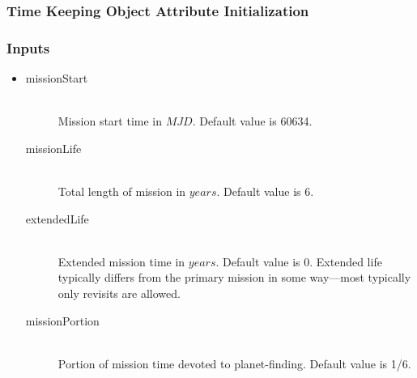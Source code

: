 \documentclass[cleanfoot]{asme2ej}
\begin{document}
\subsubsection{Time Keeping Object Attribute Initialization}

\subsubsection*{Inputs}
\begin{itemize}
    \item
     \begin{description}
            \item[missionStart] \hfill \\
            Mission start time in $ MJD $. Default value is 60634.
            \item[missionLife] \hfill \\
            Total length of mission in $ years $. Default value is 6.
            \item[extendedLife] \hfill \\
            Extended mission time in $ years $. Default value is 0.  Extended life typically differs from the primary mission in some way---most typically only revisits are allowed.
            \item[missionPortion] \hfill \\
            Portion of mission time devoted to planet-finding. Default value is 1/6.
        \end{description}
\end{itemize}
\end{document}
